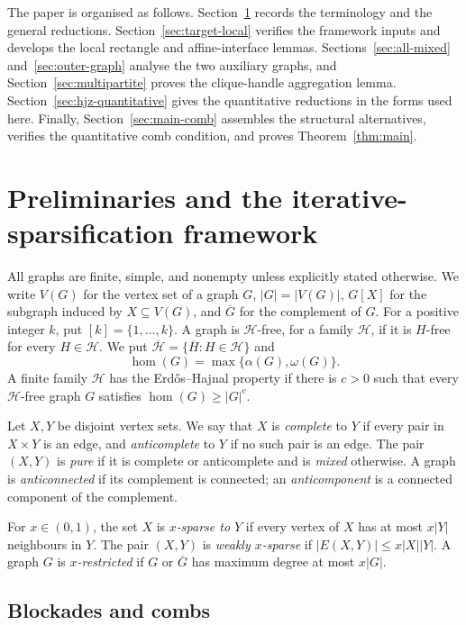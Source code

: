 \documentclass[11pt]{article}
\numberwithin{equation}{section}
\theoremstyle{plain}
\theoremstyle{definition}
\begin{document}
The paper is organised as follows.  Section~\ref{sec:preliminaries}
records the terminology and the general reductions.
Section~\ref{sec:target-local} verifies the framework inputs and develops
the local rectangle and affine-interface lemmas.
Sections~\ref{sec:all-mixed} and~\ref{sec:outer-graph} analyse the two
auxiliary graphs, and Section~\ref{sec:multipartite} proves the
clique-handle aggregation lemma.  Section~\ref{sec:hjz-quantitative}
gives the quantitative reductions in the forms used here.  Finally,
Section~\ref{sec:main-comb} assembles the structural alternatives,
verifies the quantitative comb condition, and proves
Theorem~\ref{thm:main}.

\section{Preliminaries and the iterative-sparsification framework}
\label{sec:preliminaries}

All graphs are finite, simple, and nonempty unless explicitly stated
otherwise.  We write $V(G)$ for the vertex set
of a graph $G$, $|G|=|V(G)|$, $G[X]$ for the subgraph induced by
$X\subseteq V(G)$, and $\overline G$ for the complement of $G$.  For a
positive integer $k$, put $[k]=\{1,\ldots,k\}$.  A graph is
$\mathcal H$-free, for a family $\mathcal H$, if it is $H$-free for
every $H\in\mathcal H$.  We put
$\overline{\mathcal H}=\{\overline H:H\in\mathcal H\}$ and
\[
             \operatorname{hom}(G)=
             \max\{\alpha(G),\omega(G)\}.
\]
A finite family $\mathcal H$ has the Erd\H{o}s--Hajnal property if
there is $c>0$ such that every $\mathcal H$-free graph $G$ satisfies
$\operatorname{hom}(G)\geq |G|^c$.

Let $X,Y$ be disjoint vertex sets.  We say that $X$ is
\emph{complete} to $Y$ if every pair in $X\times Y$ is an edge, and
\emph{anticomplete} to $Y$ if no such pair is an edge.  The pair
$(X,Y)$ is \emph{pure} if it is complete or anticomplete and is
\emph{mixed} otherwise.  A graph is \emph{anticonnected} if its
complement is connected; an \emph{anticomponent} is a connected
component of the complement.

For $x\in(0,1)$, the set $X$ is \emph{$x$-sparse to $Y$} if every
vertex of $X$ has at most $x|Y|$ neighbours in $Y$.  The pair $(X,Y)$ is
\emph{weakly $x$-sparse} if
$|E(X,Y)|\leq x|X||Y|$.  A graph $G$ is \emph{$x$-restricted} if
$G$ or $\overline G$ has maximum degree at most $x|G|$.

\subsection{Blockades and combs}
\end{document}
